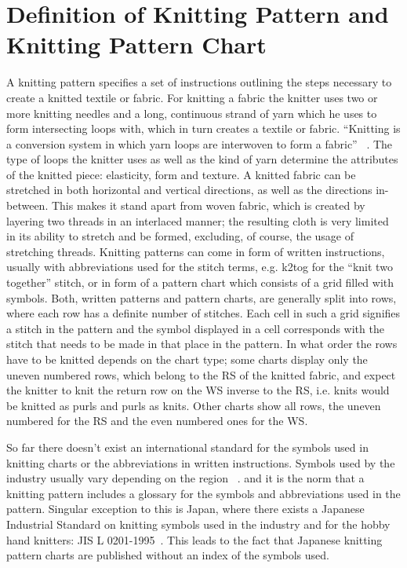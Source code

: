 \section{Definition of Knitting Pattern and Knitting Pattern Chart}

A knitting pattern specifies a set of instructions outlining the steps necessary to create a knitted textile or fabric. For knitting a fabric the knitter uses two or more knitting needles and a long, continuous strand of yarn which he uses to form intersecting loops with, which in turn creates a textile or fabric. ``Knitting is a conversion system in which yarn loops are interwoven to form a fabric'' ~\cite[p17]{Raz1993}. The type of loops the knitter uses as well as the kind of yarn determine the attributes of the knitted piece: elasticity, form and texture. A knitted fabric can be stretched in both horizontal and vertical directions, as well as the directions in-between. This makes it stand apart from woven fabric, which is created by layering two threads in an interlaced manner; the resulting cloth is very limited in its ability to stretch and be formed, excluding, of course, the usage of stretching threads. 
Knitting patterns can come in form of written instructions, usually with abbreviations used for the stitch terms, e.g. k2tog for the ``knit two together'' stitch, or in form of a pattern chart which consists of a grid filled with symbols. Both, written patterns and pattern charts, are generally split into rows, where each row has a definite number of stitches. Each cell in such a grid signifies a stitch in the pattern and the symbol displayed in a cell corresponds with the stitch that needs to be made in that place in the pattern. In what order the rows have to be knitted depends on the chart type; some charts display only the uneven numbered rows, which belong to the \gls{RS} of the knitted fabric, and expect the knitter to knit the return row on the \gls{WS} inverse to the \gls{RS}, i.e. knits would be knitted as purls and purls as knits. Other charts show all rows, the uneven numbered for the \gls{RS} and the even numbered ones for the WS.

So far there doesn't exist an international standard for the symbols used in knitting charts or the abbreviations in written instructions. Symbols used by the industry usually vary depending on the region ~\cite[p57]{Raz1993}. and it is the norm that a knitting pattern includes a glossary for the symbols and abbreviations used in the pattern. Singular exception to this is Japan, where there exists a Japanese Industrial Standard on knitting symbols used in the industry and for the hobby hand knitters: JIS L 0201-1995~\cite{JKCA1995}. This leads to the fact that Japanese knitting pattern charts are published without an index of the symbols used.

